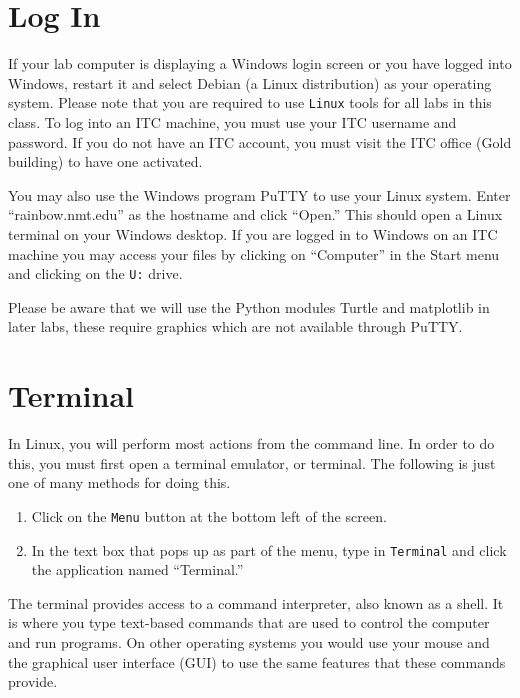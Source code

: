 \documentclass[11pt]{cselabheader}
\begin{document}
\newpage
{}

\section{Log In}

If your lab computer is displaying a Windows login screen or you have logged
into Windows, restart it and select Debian (a Linux distribution) as your
operating system. Please note that you are required to use \texttt{Linux} tools
for all labs in this class.  To log into an ITC machine, you must
use your ITC username and password.  If you do not have an ITC account, you
must visit the ITC office (Gold building) to have one activated.

You may also use the Windows program PuTTY to use your Linux
system. Enter ``rainbow.nmt.edu'' as the hostname and click ``Open.'' This
should open a Linux terminal on your Windows desktop.  If you are logged in to
Windows on an ITC machine you may access your files by clicking on ``Computer''
in the Start menu and clicking on the \texttt{U:} drive.

Please be aware that we will use the Python modules Turtle and
matplotlib in later labs, these require graphics which are not
available through PuTTY.

\section{Terminal}

In Linux, you will perform most actions from the command line. In order to do
this, you must first open a terminal emulator, or terminal.
The following is just one of many methods for doing this.

\begin{enumerate}
\def\labelenumi{\arabic{enumi}.}
\tightlist
\item
  Click on the \texttt{Menu} button at the bottom left of the screen.
\item
  In the text box that pops up as part of the menu, type in
  \texttt{Terminal} and click the application named ``Terminal.''
\end{enumerate}

The terminal provides access to a command interpreter, also known as
a shell. It is where you type text-based commands that are used to
control the computer and run programs.
On other operating systems you would use your mouse and the graphical
user interface (GUI) to use the same features that these commands
provide.
\end{document}
